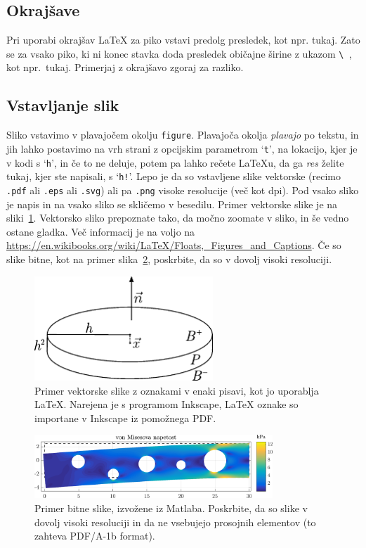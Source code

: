 \documentclass[12pt,a4paper,twoside]{article}
\theoremstyle{definition} %
\theoremstyle{plain} %
\numberwithin{equation}{section}  %
\begin{document}
\subsection{Okrajšave}
Pri uporabi okrajšav \LaTeX{} za piko vstavi predolg presledek, kot npr. tukaj. Zato se za vsako
piko, ki ni konec stavka doda presledek običajne širine z ukazom \verb*|\ |, kot npr.\ tukaj.
Primerjaj z okrajšavo zgoraj za razliko.

\subsection{Vstavljanje slik}
Sliko vstavimo v plavajočem okolju \texttt{figure}. Plavajoča okolja \emph{plavajo} po tekstu, in
jih lahko postavimo na vrh strani z opcijskim parametrom `\texttt{t}', na lokacijo, kjer je v kodi s
`\texttt{h}', in če to ne deluje, potem pa lahko rečete \LaTeX u, da ga \emph{res} želite tukaj,
kjer ste napisali, s `\texttt{h!}'. Lepo je da so vstavljene slike vektorske (recimo \texttt{.pdf}
ali \texttt{.eps} ali \texttt{.svg}) ali pa \texttt{.png} visoke resolucije (več kot
\unit[300]{dpi}).  Pod vsako sliko je napis in na vsako sliko se skličemo v besedilu. Primer
vektorske slike je na sliki~\ref{fig:sample}. Vektorsko sliko prepoznate tako, da močno
zoomate v sliko, in še vedno ostane gladka. Več informacij je na voljo na
\url{https://en.wikibooks.org/wiki/LaTeX/Floats,_Figures_and_Captions}. Če so slike bitne, kot na
primer slika~\ref{fig:image}, poskrbite, da so v dovolj visoki resoluciji.

\begin{figure}[h]
  \centering
  \includegraphics[width=0.6\textwidth]{images/sample.pdf}
  \caption[Primer vektorske slike.]{Primer vektorske slike z oznakami v enaki pisavi, kot jo
     uporablja \LaTeX{}.  Narejena je s programom Inkscape, \LaTeX{} oznake so importane v
     Inkscape iz pomožnega PDF.}
  \label{fig:sample}
\end{figure}

\begin{figure}[h]
  \centering
  \includegraphics[width=0.8\textwidth]{images/image.png}
  \caption[Primer bitne slike.]{Primer bitne slike, izvožene iz Matlaba. Poskrbite, da so slike v
  dovolj visoki resoluciji in da ne vsebujejo prosojnih elementov (to zahteva PDF/A-1b format).}
  \label{fig:image}
\end{figure}
\end{document}
